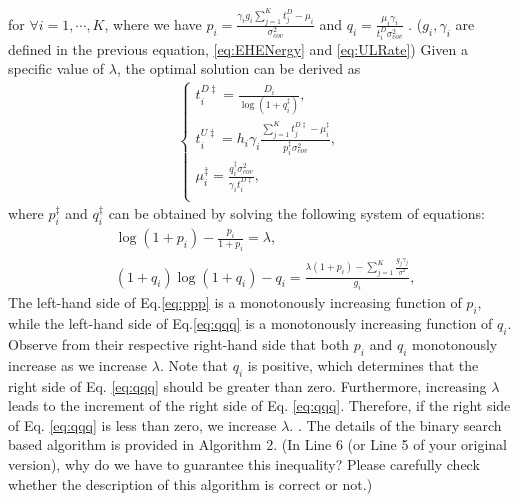 \documentclass[12pt,draft,onecolumn,journal]{IEEEtran}
\begin{document}
for $\forall i = 1,\cdots,K$, where we have  \cbstart $p_i = \frac{\gamma_ig_i\sum_{j=1}^{K}t_j^D-\mu_i}{\sigma_{cov}^2}$ and $q_i = \frac{\mu_i\gamma_i}{t_i^{D}\sigma_{cov}^2}$ \cbend. {\color{red} ($g_i, \gamma_i$ are defined in the previous equation, \eqref{eq:EHENergy} and \eqref{eq:ULRate})} Given a specific value of $\lambda$, the optimal solution can be derived as
\begin{align}
	\left\{
	\begin{array}{l}
		t_i^{D\ddagger}=\frac{D_i}{\log(1+q_i^\ddagger)}, \\
		t_i^{U\ddagger}=h_i\gamma_i\frac{\sum_{j=1}^K{t_j^{D\ddagger}}-\mu_i^\ddagger}{p_i^\ddagger\sigma_{cov}^2},\\
        \mu_i^\ddagger=\frac{q_i^\ddagger\sigma_{cov}^2}{\gamma_i t_i^{D\ddagger}}, \\
	\end{array}
	\right. \label{eq:Sum-Opt}
\end{align}
where $p_{i}^{\ddagger}$ and $q_{i}^{\ddagger}$ can be obtained by solving the following system of equations:
\begin{align}
	&\log(1+p_i)-\frac{p_i}{1+p_i}=\lambda, \label{eq:ppp} \\
	&(1+q_i)\log(1+q_i) - q_i=\frac{\lambda(1+p_i) - \sum_{j=1}^{K}\frac{g_j\gamma_j}{\sigma^2}}{g_i}, \label{eq:qqq}
\end{align}
The left-hand side of Eq.\eqref{eq:ppp} is a monotonously increasing function of $p_i$, while the left-hand side of Eq.\eqref{eq:qqq} is a monotonously increasing function of $q_i$. Observe from their respective right-hand side that both $p_i$ and $q_i$ monotonously increase as we increase $\lambda$. \cbstart Note that $q_i$ is positive, which determines that the right side of Eq. \eqref{eq:qqq} should be greater than zero. Furthermore, increasing $\lambda$ leads to the increment of the right side of Eq. \eqref{eq:qqq}. Therefore, if the right side of Eq. \eqref{eq:qqq} is less than zero, we increase $\lambda$. . The details of the binary search based algorithm is provided in Algorithm 2. {\color{red} (In Line 6 (or Line 5 of your original version), why do we have to guarantee this inequality? Please carefully check whether the description of this algorithm is correct or not.)} 
\end{document}
